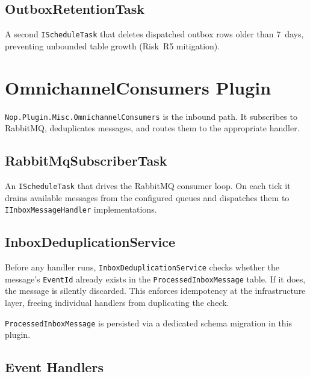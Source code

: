 \subsection{OutboxRetentionTask}

A second \texttt{IScheduleTask} that deletes dispatched outbox rows older than 7~days, preventing unbounded table growth (Risk~R5 mitigation).

\section{OmnichannelConsumers Plugin}

\texttt{Nop.\-Plugin.\-Misc.\-Omnichannel\-Consumers} is the inbound path. It subscribes to RabbitMQ, deduplicates messages, and routes them to the appropriate handler.

\subsection{RabbitMqSubscriberTask}

An \texttt{IScheduleTask} that drives the RabbitMQ consumer loop. On each tick it drains available messages from the configured queues and dispatches them to \texttt{IInboxMessageHandler} implementations.

\subsection{InboxDeduplicationService}

Before any handler runs, \texttt{InboxDeduplicationService} checks whether the message's \texttt{EventId} already exists in the \texttt{ProcessedInboxMessage} table. If it does, the message is silently discarded. This enforces idempotency at the infrastructure layer, freeing individual handlers from duplicating the check.

\texttt{ProcessedInboxMessage} is persisted via a dedicated schema migration in this plugin.

\subsection{Event Handlers}

